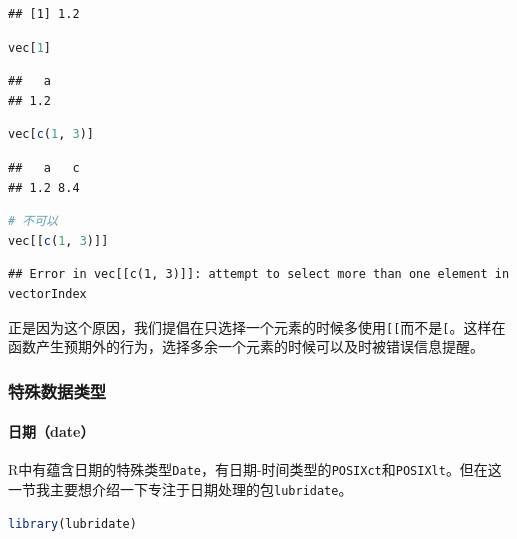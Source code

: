 \documentclass[]{ctexbook}
\let\oldparagraph\paragraph
\renewcommand{\paragraph}[1]{\oldparagraph{#1}\mbox{}}
\newcommand{\passthrough}[1]{#1}
\begin{document}
\begin{lstlisting}
## [1] 1.2
\end{lstlisting}

\begin{lstlisting}[language=R]
vec[1]
\end{lstlisting}

\begin{lstlisting}
##   a 
## 1.2
\end{lstlisting}

\begin{lstlisting}[language=R]
vec[c(1, 3)]
\end{lstlisting}

\begin{lstlisting}
##   a   c 
## 1.2 8.4
\end{lstlisting}

\begin{lstlisting}[language=R]
# 不可以
vec[[c(1, 3)]]
\end{lstlisting}

\begin{lstlisting}
## Error in vec[[c(1, 3)]]: attempt to select more than one element in vectorIndex
\end{lstlisting}

正是因为这个原因，我们提倡在只选择一个元素的时候多使用\passthrough{\lstinline![[!}而不是\passthrough{\lstinline![!}。这样在函数产生预期外的行为，选择多余一个元素的时候可以及时被错误信息提醒。

\hypertarget{ux7279ux6b8aux6570ux636eux7c7bux578b}{%
\subsubsection{特殊数据类型}\label{ux7279ux6b8aux6570ux636eux7c7bux578b}}

\hypertarget{ux65e5ux671fdate}{%
\paragraph{日期（date）}\label{ux65e5ux671fdate}}

R中有蕴含日期的特殊类型\passthrough{\lstinline!Date!}，有日期-时间类型的\passthrough{\lstinline!POSIXct!}和\passthrough{\lstinline!POSIXlt!}。但在这一节我主要想介绍一下专注于日期处理的包\passthrough{\lstinline!lubridate!}。

\begin{lstlisting}[language=R]
library(lubridate)
\end{lstlisting}
\end{document}
